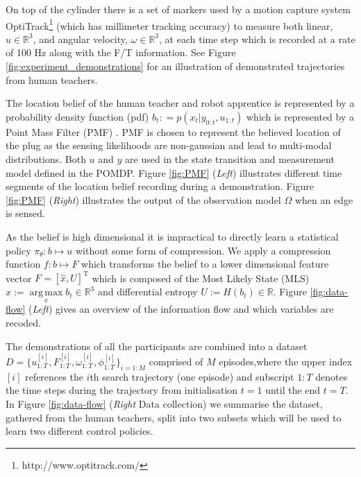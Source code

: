 \documentclass[final,5p,times,twocolumn]{elsarticle}
\DeclareMathOperator*{\argmax}{arg\,max}
\begin{document}
On top of the cylinder there is a set of markers used by a motion capture system 
OptiTrack\footnote{http://www.optitrack.com/} (which has millimeter tracking accuracy) to measure 
both linear, $u \in \mathbb{R}^3$, and angular velocity, $\omega \in \mathbb{R}^3$, at each 
time step which is recorded at a rate of 100 Hz along with the F/T information. See Figure \ref{fig:experiment_demonstrations}
for an illustration of demonstrated trajectories from human teachers.


The location belief of the human teacher and robot apprentice is represented by a probability density function (pdf) ${b_t: = p(x_t|y_{0:t},u_{1:t})}$
which is represented by a Point Mass Filter (PMF) \cite[p.87]{Bergman99recursivebayesian}. PMF is chosen to represent the 
believed location of the plug as the sensing likelihoods are non-gaussian and lead to multi-modal distributions. 
Both $u$ and $y$ are used in the state transition and measurement model defined in the POMDP. 
Figure \ref{fig:PMF} (\textit{Left}) illustrates different time segments of the location belief recording during a demonstration. 
Figure \ref{fig:PMF} (\textit{Right}) illustrates the output of the observation model $\Omega$ when an edge is sensed. 

As the belief is high dimensional it is impractical to directly learn a statistical policy ${\pi_{\theta} : b \mapsto u }$ without 
some form of compression. We apply a compression function ${f : b \mapsto F}$ which transforms the belief to a lower 
dimensional feature vector  ${F = [\hat{x},U]^{\mathrm{T}}}$ which is composed of 
the Most Likely State (MLS) ${\hat{x} := \argmax\limits_{x} b_t \in \mathbb{R}^3}$ and differential entropy ${U := H(b_t) \in \mathbb{R}}$.
Figure \ref{fig:data-flow} (\textit{Left}) gives an overview of the information flow and which variables are recoded.

The demonstrations of all the participants are combined into a dataset ${D=\{u^{[i]}_{1:T},F^{[i]}_{1:T},\omega^{[i]}_{1:T},\phi^{[i]}_{1:T}\}_{i=1:M}}$
comprised of $M$ episodes,where the upper index $[i]$ references the $i$th search trajectory (one episode) and subscript ${1:T}$ denotes the time 
steps during the trajectory from initialisation $t=1$ until the end $t=T$. In Figure \ref{fig:data-flow} (\textit{Right} Data collection) we summarise 
the dataset, gathered from the human teachers, split into two subsets which will be used to learn two different control policies. 
\end{document}
